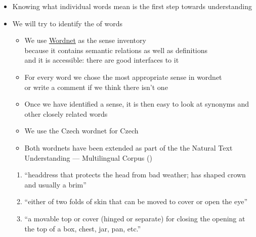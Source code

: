 \documentclass[a4paper,landscape,headrule,footrule,xetex]{foils}
\begin{document}
\begin{itemize}
\item Knowing what individual words mean is the first step towards understanding
\item We will try to identify the  of words
  \begin{itemize}
  \item We use \href{https://wordnet.princeton.edu/}{Wordnet} \citep{_Fellbaum:1998} as the sense inventory
    \\ because it contains semantic relations as well as definitions
    \\ and it is accessible: there are good interfaces to it
  \item For every word we chose the most appropriate sense in wordnet
    \\ or write a comment if we think there isn't one
  \item Once we have identified a sense, it is then easy to look at
    synonyms and other closely related words
  \item We use the Czech wordnet \citep{Pala:Smrz:2004} for Czech
  \item Both wordnets have been extended as part of the the Natural Text Understanding --- Multilingual Corpus ()
  \end{itemize}
  \newpage
{}

 \task{}
  \begin{enumerate}\small
  \item {} ``headdress that protects the head
    from bad weather; has shaped crown and usually a brim''
  \item {} ``either of two folds of skin that
    can be moved to cover or open the eye''
  \item {} ``a movable top or cover (hinged or separate) for closing the opening at the top of a box, chest, jar, pan, etc.''  \end{enumerate}
 

\end{itemize}
\end{document}
